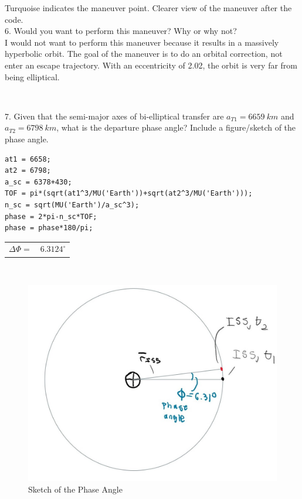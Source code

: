 \documentclass[hidelinks,12pt]{article}
\begin{document}
Turquoise indicates the maneuver point. Clearer view of the maneuver after the code.\\
\vspace{10px}
6. Would you want to perform this maneuver? Why or why not?\\
I would not want to perform this maneuver because it results in a
massively hyperbolic orbit. The goal of the maneuver is to do an orbital
correction, not enter an escape trajectory. With an eccentricity of 2.02,
the orbit is very far from being elliptical.
\begin{tabular}{rl}
\end{tabular}\\
\vspace{10px}
7. Given that the semi-major axes of bi-elliptical transfer are $a_{T1}=6659~km$ and $a_{T2}=6798~km$, what is the departure phase angle? Include a figure/sketch of the phase angle.\\
\begin{lstlisting}[frame=lines,style=Matlab-editor,basicstyle = \mlttfamily]
at1 = 6658;
at2 = 6798;
a_sc = 6378+430;
TOF = pi*(sqrt(at1^3/MU('Earth'))+sqrt(at2^3/MU('Earth')));
n_sc = sqrt(MU('Earth')/a_sc^3);
phase = 2*pi-n_sc*TOF;
phase = phase*180/pi;
\end{lstlisting}
\begin{tabular}{rl}
  $\Delta \Phi=$ & $6.3124^\circ$
\end{tabular}\\
\begin{figure}[!htb]
  \center
  \includegraphics[scale=0.9]{p7}
  \caption{Sketch of the Phase Angle}
  \label{fig:temp}
\end{figure}
\end{document}
